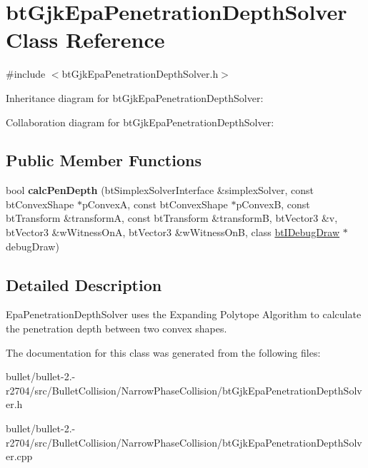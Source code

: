 \hypertarget{classbt_gjk_epa_penetration_depth_solver}{\section{bt\+Gjk\+Epa\+Penetration\+Depth\+Solver Class Reference}
\label{classbt_gjk_epa_penetration_depth_solver}
}


{\ttfamily \#include $<$bt\+Gjk\+Epa\+Penetration\+Depth\+Solver.\+h$>$}



Inheritance diagram for bt\+Gjk\+Epa\+Penetration\+Depth\+Solver\+:


Collaboration diagram for bt\+Gjk\+Epa\+Penetration\+Depth\+Solver\+:
\subsection*{Public Member Functions}
\begin{DoxyCompactItemize}
\item 
\hypertarget{classbt_gjk_epa_penetration_depth_solver_aaeeab27cb89355993c849a1a7ff9e34a}{bool {\bfseries calc\+Pen\+Depth} (bt\+Simplex\+Solver\+Interface \&simplex\+Solver, const bt\+Convex\+Shape $\ast$p\+Convex\+A, const bt\+Convex\+Shape $\ast$p\+Convex\+B, const bt\+Transform \&transform\+A, const bt\+Transform \&transform\+B, bt\+Vector3 \&v, bt\+Vector3 \&w\+Witness\+On\+A, bt\+Vector3 \&w\+Witness\+On\+B, class \hyperlink{classbt_i_debug_draw}{bt\+I\+Debug\+Draw} $\ast$debug\+Draw)}\label{classbt_gjk_epa_penetration_depth_solver_aaeeab27cb89355993c849a1a7ff9e34a}

\end{DoxyCompactItemize}


\subsection{Detailed Description}
Epa\+Penetration\+Depth\+Solver uses the Expanding Polytope Algorithm to calculate the penetration depth between two convex shapes. 

The documentation for this class was generated from the following files\+:\begin{DoxyCompactItemize}
\item 
bullet/bullet-\/2.-\/r2704/src/\+Bullet\+Collision/\+Narrow\+Phase\+Collision/bt\+Gjk\+Epa\+Penetration\+Depth\+Solver.\+h\item 
bullet/bullet-\/2.-\/r2704/src/\+Bullet\+Collision/\+Narrow\+Phase\+Collision/bt\+Gjk\+Epa\+Penetration\+Depth\+Solver.\+cpp\end{DoxyCompactItemize}
